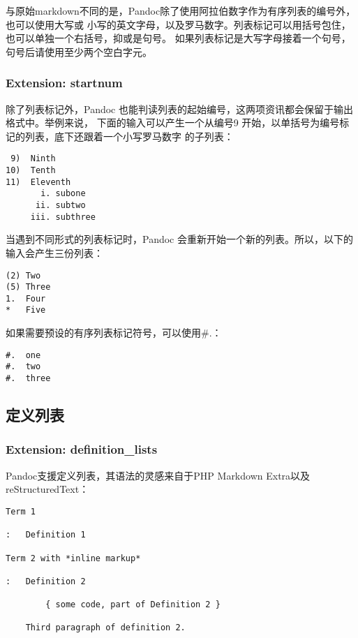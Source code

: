 \documentclass[fancyhdr,bookmark]{ctexbook}
\begin{document}
与原始markdown不同的是，Pandoc除了使用阿拉伯数字作为有序列表的编号外，也可以使用大写或
小写的英文字母，以及罗马数字。列表标记可以用括号包住，也可以单独一个右括号，抑或是句号。
如果列表标记是大写字母接着一个句号，句号后请使用至少两个空白字元。

\hypertarget{extension-startnum}{%
\subsubsection{Extension: startnum}\label{extension-startnum}}

除了列表标记外，Pandoc
也能判读列表的起始编号，这两项资讯都会保留于输出格式中。举例来说，
下面的输入可以产生一个从编号9
开始，以单括号为编号标记的列表，底下还跟着一个小写罗马数字 的子列表：

\begin{lstlisting}
 9)  Ninth
10)  Tenth
11)  Eleventh
       i. subone
      ii. subtwo
     iii. subthree
\end{lstlisting}

当遇到不同形式的列表标记时，Pandoc
会重新开始一个新的列表。所以，以下的输入会产生三份列表：

\begin{lstlisting}
(2) Two
(5) Three
1.  Four
*   Five
\end{lstlisting}

如果需要预设的有序列表标记符号，可以使用\#.：

\begin{lstlisting}
#.  one
#.  two
#.  three
\end{lstlisting}

\hypertarget{ux5b9aux4e49ux5217ux8868}{%
\subsection{定义列表}\label{ux5b9aux4e49ux5217ux8868}}

\hypertarget{extension-definition_lists}{%
\subsubsection{Extension:
definition\_lists}\label{extension-definition_lists}}

Pandoc支援定义列表，其语法的灵感来自于PHP Markdown
Extra以及reStructuredText：

\begin{lstlisting}
Term 1

:   Definition 1

Term 2 with *inline markup*

:   Definition 2

        { some code, part of Definition 2 }

    Third paragraph of definition 2.
\end{lstlisting}
\end{document}
